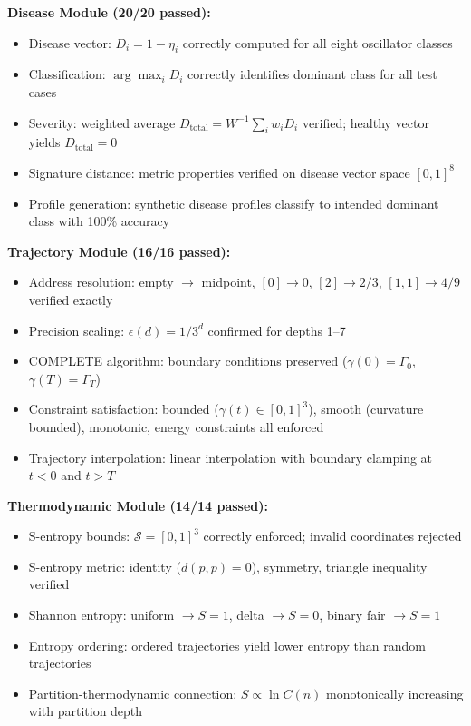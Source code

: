 \documentclass[11pt,twocolumn,a4paper]{article}
\theoremstyle{definition}
\theoremstyle{remark}
\begin{document}
\textbf{Disease Module (20/20 passed):}
\begin{itemize}
\item Disease vector: $D_i = 1 - \eta_i$ correctly computed for all eight oscillator classes
\item Classification: $\arg\max_i D_i$ correctly identifies dominant class for all test cases
\item Severity: weighted average $D_{\mathrm{total}} = W^{-1}\sum_i w_i D_i$ verified; healthy vector yields $D_{\mathrm{total}} = 0$
\item Signature distance: metric properties verified on disease vector space $[0,1]^8$
\item Profile generation: synthetic disease profiles classify to intended dominant class with 100\% accuracy
\end{itemize}

\textbf{Trajectory Module (16/16 passed):}
\begin{itemize}
\item Address resolution: empty $\to$ midpoint, $[0] \to 0$, $[2] \to 2/3$, $[1,1] \to 4/9$ verified exactly
\item Precision scaling: $\epsilon(d) = 1/3^d$ confirmed for depths 1--7
\item COMPLETE algorithm: boundary conditions preserved ($\gamma(0) = \Gamma_0$, $\gamma(T) = \Gamma_T$)
\item Constraint satisfaction: bounded ($\gamma(t) \in [0,1]^3$), smooth (curvature bounded), monotonic, energy constraints all enforced
\item Trajectory interpolation: linear interpolation with boundary clamping at $t < 0$ and $t > T$
\end{itemize}

\textbf{Thermodynamic Module (14/14 passed):}
\begin{itemize}
\item S-entropy bounds: $\mathcal{S} = [0,1]^3$ correctly enforced; invalid coordinates rejected
\item S-entropy metric: identity ($d(p,p) = 0$), symmetry, triangle inequality verified
\item Shannon entropy: uniform $\to S = 1$, delta $\to S = 0$, binary fair $\to S = 1$
\item Entropy ordering: ordered trajectories yield lower entropy than random trajectories
\item Partition-thermodynamic connection: $S \propto \ln C(n)$ monotonically increasing with partition depth
\end{itemize}
\end{document}

